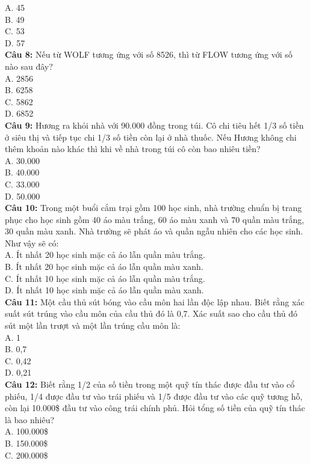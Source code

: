 \begin{multicols}{2}
A. 45 \\
B. 49 \\
C. 53 \\
D. 57 \\
\textbf{Câu 8:} Nếu từ WOLF tương ứng với số 8526, thì từ FLOW tương ứng với số nào sau đây? \\
A. 2856 \\
B. 6258 \\
C. 5862 \\
D. 6852 \\
\textbf{Câu 9:} Hương ra khỏi nhà với 90.000 đồng trong túi. Cô chi tiêu hết 1/3 số tiền ở siêu thị và tiếp tục chi 1/3 số tiền còn lại ở nhà thuốc. Nếu Hương không chi thêm khoản nào khác thì khi về nhà trong túi cô còn bao nhiêu tiền? \\
A. 30.000 \\
B. 40.000 \\
C. 33.000 \\
D. 50.000 \\
\textbf{Câu 10:} Trong một buổi cắm trại gồm 100 học sinh, nhà trường chuẩn bị trang phục cho học sinh gồm 40 áo màu trắng, 60 áo màu xanh và 70 quần màu trắng, 30 quần màu xanh. Nhà trường sẽ phát áo và quần ngẫu nhiên cho các học sinh. Như vậy sẽ có: \\
A. Ít nhất 20 học sinh mặc cả áo lẫn quần màu trắng. \\
B. Ít nhất 20 học sinh mặc cả áo lẫn quần màu xanh. \\
C. Ít nhất 10 học sinh mặc cả áo lẫn quần màu trắng. \\
D. Ít nhất 10 học sinh mặc cả áo lẫn quần màu xanh. \\
\textbf{Câu 11:} Một cầu thủ sút bóng vào cầu môn hai lần độc lập nhau. Biết rằng xác suất sút trúng vào cầu môn của cầu thủ đó là 0,7. Xác suất sao cho cầu thủ đó sút một lần trượt và một lần trúng cầu môn là: \\
A. 1 \\
B. 0,7 \\
C. 0,42 \\
D. 0,21 \\
\textbf{Câu 12:} Biết rằng 1/2 của số tiền trong một quỹ tín thác được đầu tư vào cổ phiếu, 1/4 được đầu tư vào trái phiếu và 1/5 được đầu tư vào các quỹ tương hỗ, còn lại 10.000\$ đầu tư vào công trái chính phủ. Hỏi tổng số tiền của quỹ tín thác là bao nhiêu? \\
A. 100.000\$ \\
B. 150.000\$ \\
C. 200.000\$ \\

\end{multicols}
